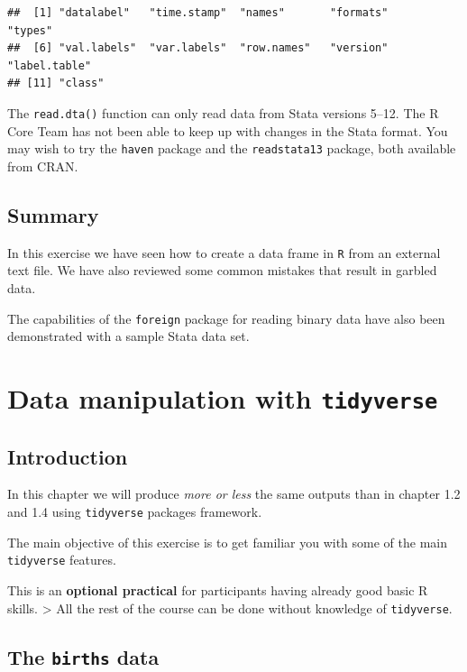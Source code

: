 \documentclass[
]{book}
\theoremstyle{definition}
\theoremstyle{definition}
\theoremstyle{definition}
\theoremstyle{definition}
\theoremstyle{remark}
\begin{document}
\begin{verbatim}
##  [1] "datalabel"   "time.stamp"  "names"       "formats"     "types"      
##  [6] "val.labels"  "var.labels"  "row.names"   "version"     "label.table"
## [11] "class"
\end{verbatim}

The \texttt{read.dta()} function can only read data from Stata
versions 5--12. The R Core Team has not been able to keep up with
changes in the Stata format. You may wish to try the \texttt{haven}
package and the \texttt{readstata13} package, both available from
CRAN.

\section{Summary}\label{summary}

In this exercise we have seen how to create a data frame in \texttt{R}
from an external text file. We have also reviewed some common mistakes
that result in garbled data.

The capabilities of the \texttt{foreign} package for reading binary
data have also been demonstrated with a sample Stata data set.

\chapter{\texorpdfstring{Data manipulation with \texttt{tidyverse}}{Data manipulation with tidyverse}}\label{data-manipulation-with-tidyverse}

\section{Introduction}\label{introduction-1}

In this chapter we will produce \emph{more or less} the same outputs than in chapter 1.2 and 1.4 using
\texttt{tidyverse} packages framework.

The main objective of this exercise is to get familiar you with some of the main \texttt{tidyverse} features.

This is an \textbf{optional practical} for participants having already good basic R skills.
\textgreater{} All the rest of the course can be done without knowledge of \texttt{tidyverse}.

\section{\texorpdfstring{The \texttt{births} data}{The births data}}\label{the-births-data}
\end{document}
